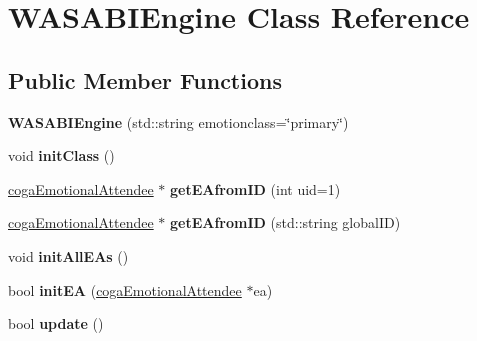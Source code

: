 \hypertarget{class_w_a_s_a_b_i_engine}{
\section{\-W\-A\-S\-A\-B\-I\-Engine \-Class \-Reference}
\label{class_w_a_s_a_b_i_engine}
}
\subsection*{\-Public \-Member \-Functions}
\begin{DoxyCompactItemize}
\item 
\hypertarget{class_w_a_s_a_b_i_engine_a540e648058255c16b40d44307fb5b3d4}{
{\bfseries \-W\-A\-S\-A\-B\-I\-Engine} (std\-::string emotionclass=\char`\"{}primary\char`\"{})}
\label{class_w_a_s_a_b_i_engine_a540e648058255c16b40d44307fb5b3d4}

\item 
\hypertarget{class_w_a_s_a_b_i_engine_a1f423672efd6835807341801d6acc5c9}{
void {\bfseries init\-Class} ()}
\label{class_w_a_s_a_b_i_engine_a1f423672efd6835807341801d6acc5c9}

\item 
\hypertarget{class_w_a_s_a_b_i_engine_a3bff7681c6bb49d1b6bfd3aa351c2d22}{
\hyperlink{classcoga_emotional_attendee}{coga\-Emotional\-Attendee} $\ast$ {\bfseries get\-E\-Afrom\-I\-D} (int uid=1)}
\label{class_w_a_s_a_b_i_engine_a3bff7681c6bb49d1b6bfd3aa351c2d22}

\item 
\hypertarget{class_w_a_s_a_b_i_engine_a04703a0f51c836c5289ae40311bfda5d}{
\hyperlink{classcoga_emotional_attendee}{coga\-Emotional\-Attendee} $\ast$ {\bfseries get\-E\-Afrom\-I\-D} (std\-::string global\-I\-D)}
\label{class_w_a_s_a_b_i_engine_a04703a0f51c836c5289ae40311bfda5d}

\item 
\hypertarget{class_w_a_s_a_b_i_engine_a1ca90c61e77cc5c2495ed877f19c9872}{
void {\bfseries init\-All\-E\-As} ()}
\label{class_w_a_s_a_b_i_engine_a1ca90c61e77cc5c2495ed877f19c9872}

\item 
\hypertarget{class_w_a_s_a_b_i_engine_a8c2418e79b911f27069db8bcc8678385}{
bool {\bfseries init\-E\-A} (\hyperlink{classcoga_emotional_attendee}{coga\-Emotional\-Attendee} $\ast$ea)}
\label{class_w_a_s_a_b_i_engine_a8c2418e79b911f27069db8bcc8678385}

\item 
\hypertarget{class_w_a_s_a_b_i_engine_aec2bc2264141f0e458c04c80806c5bc4}{
bool {\bfseries update} ()}
\label{class_w_a_s_a_b_i_engine_aec2bc2264141f0e458c04c80806c5bc4}


\end{DoxyCompactItemize}
